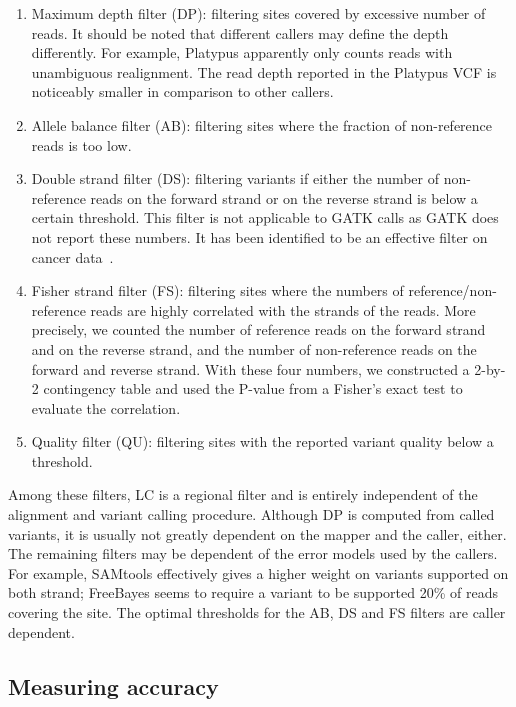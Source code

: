 \documentclass{bioinfo}
\begin{document}
\begin{methods}
\begin{enumerate}
\item Maximum depth filter (DP): filtering sites covered by excessive number of
reads. It should be noted that different callers may define the depth
differently. For example, Platypus apparently only counts reads with
unambiguous realignment. The read depth reported in the Platypus VCF is
noticeably smaller in comparison to other callers.

\item Allele balance filter (AB): filtering sites where the fraction of
non-reference reads is too low.

\item Double strand filter (DS): filtering variants if either the number of
non-reference reads on the forward strand or on the reverse strand is below a
certain threshold. This filter is not applicable to GATK calls as GATK does not
report these numbers. It has been identified to be an effective filter on
cancer data~\citep{Roberts:2013aa,Kim:2013aa}.

\item Fisher strand filter (FS): filtering sites where the numbers of
reference/non-reference reads are highly correlated with the strands of the
reads. More precisely, we counted the number of reference reads on the forward
strand and on the reverse strand, and the number of non-reference reads on the
forward and reverse strand. With these four numbers, we constructed a 2-by-2
contingency table and used the P-value from a Fisher's exact test to evaluate
the correlation.

\item Quality filter (QU): filtering sites with the reported variant quality
below a threshold.

\end{enumerate}

Among these filters, LC is a regional filter and is entirely independent of the
alignment and variant calling procedure. Although DP is computed from called
variants, it is usually not greatly dependent on the mapper and the caller,
either. The remaining filters may be dependent of the error models used by the
callers. For example, SAMtools effectively gives a higher weight on variants
supported on both strand; FreeBayes seems to require a variant to be supported
20\% of reads covering the site. The optimal thresholds for the AB, DS and FS
filters are caller dependent.

\subsection{Measuring accuracy}


\end{methods}
\end{document}
